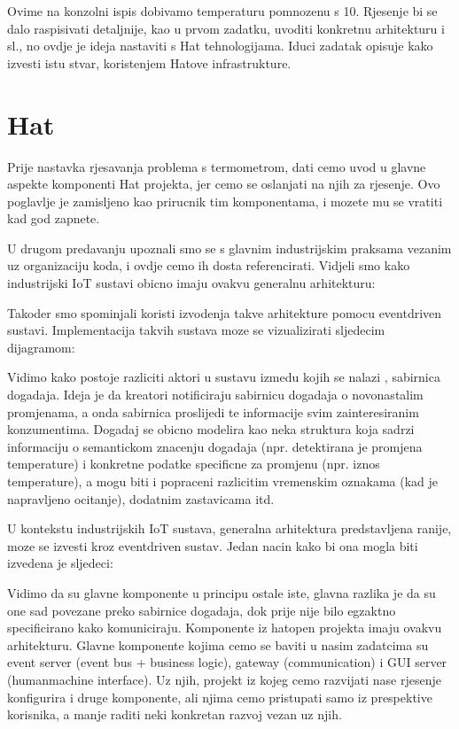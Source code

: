 \documentclass[letterpaper,10pt,croatian]{sphinxmanual}
\begin{document}
\sphinxAtStartPar
Ovime na konzolni ispis dobivamo temperaturu pomnozenu s 10. Rjesenje bi se
dalo raspisivati detaljnije, kao u prvom zadatku, uvoditi konkretnu arhitekturu
i sl., no ovdje je ideja nastaviti s Hat tehnologijama. Iduci zadatak opisuje
kako izvesti istu stvar, koristenjem Hatove infrastrukture.


\chapter{Hat}
\label{\detokenize{hat/index:hat}}\label{\detokenize{hat/index::doc}}
\sphinxAtStartPar
Prije nastavka rjesavanja problema s termometrom, dati cemo uvod u glavne
aspekte komponenti Hat projekta, jer cemo se oslanjati na njih za rjesenje. Ovo
poglavlje je zamisljeno kao prirucnik tim komponentama, i mozete mu se vratiti
kad god zapnete.

\sphinxAtStartPar
U drugom predavanju upoznali smo se s glavnim industrijskim praksama vezanim uz
organizaciju koda, i ovdje cemo ih dosta referencirati. Vidjeli smo kako
industrijski IoT sustavi obicno imaju ovakvu generalnu arhitekturu:

\sphinxAtStartPar
Takoder smo spominjali koristi izvodenja takve arhitekture pomocu event\sphinxhyphen{}driven
sustavi. Implementacija takvih sustava moze se vizualizirati sljedecim
dijagramom:

\sphinxAtStartPar
Vidimo kako postoje razliciti aktori u sustavu izmedu kojih se nalazi , sabirnica dogadaja. Ideja je da kreatori notificiraju sabirnicu dogadaja
o novonastalim promjenama, a onda sabirnica proslijedi te informacije svim
zainteresiranim konzumentima. Dogadaj se obicno modelira kao neka struktura
koja sadrzi informaciju o semantickom znacenju dogadaja (npr. detektirana je
promjena temperature) i konkretne podatke specificne za promjenu (npr. iznos
temperature), a mogu biti i popraceni razlicitim vremenskim oznakama (kad je
napravljeno ocitanje), dodatnim zastavicama itd.

\sphinxAtStartPar
U kontekstu industrijskih IoT sustava, generalna arhitektura predstavljena
ranije, moze se izvesti kroz event\sphinxhyphen{}driven sustav. Jedan nacin kako bi ona mogla
biti izvedena je sljedeci:

\sphinxAtStartPar
Vidimo da su glavne komponente u principu ostale iste, glavna razlika je da su
one sad povezane preko sabirnice dogadaja, dok prije nije bilo egzaktno
specificirano kako komuniciraju. Komponente iz hat\sphinxhyphen{}open projekta imaju ovakvu
arhitekturu. Glavne komponente kojima cemo se baviti u nasim zadatcima su event
server (event bus + business logic), gateway (communication) i GUI server
(human\sphinxhyphen{}machine interface). Uz njih, projekt iz kojeg cemo razvijati nase
rjesenje konfigurira i druge komponente, ali njima cemo pristupati samo iz
prespektive korisnika, a manje raditi neki konkretan razvoj vezan uz njih.
\end{document}
